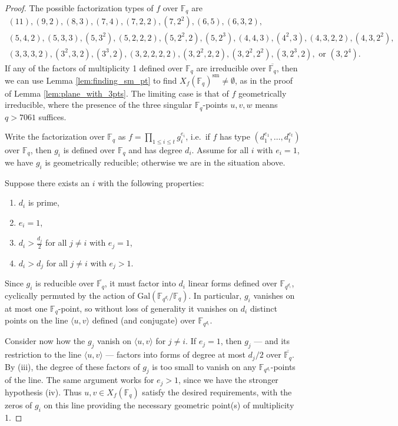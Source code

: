 \documentclass[10pt,a4paper]{amsart}
\newcommand{\F}{\mathbb{F}}
\newcommand{\Span}[1]{\langle #1 \rangle}
\newcommand{\qbound}[1]{{\color{cyan}$q > {#1}$}}
\newcommand{\sm}{\mathrm{sm}}
\begin{document}
\begin{proof}
    The possible factorization types of $f$ over $\F_q$ are
    \begin{align*}
        (11), (9,2), (8,3), 
        (7,4), (7,2,2), (7,2^2), 
        (6,5), (6,3,2), \\
        (5,4,2), (5,3,3), (5,3^2), (5,2,2,2), (5,2^2,2), (5,2^3),
        (4,4,3), (4^2,3), (4,3,2,2), (4,3,2^2),\\
        (3,3,3,2), (3^2,3,2), (3^3,2), (3,2,2,2,2), (3,2^2,2,2), (3,2^2,2^2), (3,2^3,2), \text{ or } (3,2^4).
    \end{align*}
    If any of the factors of multiplicity 1 defined over $\F_q$ are irreducible over $\overline{\F_q}$, then we can use Lemma \ref{lem:finding_sm_pt} to find $X_f(\F_q)^\sm \neq \emptyset$, as in the proof of Lemma \ref{lem:plane_with_3pts}. The limiting case is that of $f$ geometrically irreducible, where the presence of the three singular $\F_q$-points $u,v,w$ means \qbound{7061} suffices.

    Write the factorization over $\F_q$ as $f = \prod_{1 \leq i \leq t} g_i^{e_i}$, i.e.\ if $f$ has type $(d_1^{e_1},\ldots,d_t^{e_t})$ over $\F_q$, then $g_i$ is defined over $\F_q$ and has degree $d_i$. Assume for all $i$ with $e_i = 1$, we have $g_i$ is geometrically reducible; otherwise we are in the situation above.
    
    Suppose there exists an $i$ with the following properties:
    \begin{enumerate}[label = (\roman*)]
        \item $d_i$ is prime,
        \item $e_i = 1$,
        \item $d_i > \frac{d_j}{2}$ for all $j \neq i$ with $e_j = 1$,
        \item $d_i > d_j$ for all $j \neq i$ with $e_j > 1$.
    \end{enumerate}
    Since $g_i$ is reducible over $\overline{\F_q}$, it must factor into $d_i$ linear forms defined over $\F_{q^{d_i}}$, cyclically permuted by the action of $\mathrm{Gal}(\F_{q^{d_i}}/\F_q)$. In particular, $g_i$ vanishes on at most one $\F_q$-point, so without loss of generality it vanishes on $d_i$ distinct points on the line $\Span{u,v}$ defined (and conjugate) over $\F_{q^{d_i}}$.

    Consider now how the $g_j$ vanish on $\Span{u,v}$ for $j \neq i$. If $e_j = 1$, then $g_j$ --- and its restriction to the line $\Span{u,v}$ --- factors into forms of degree at most $d_j/2$ over $\overline{\F_q}$. By (iii), the degree of these factors of $g_j$ is too small to vanish on any $\F_{q^{d_i}}$-points of the line. The same argument works for $e_j > 1$, since we have the stronger hypothesis (iv). Thus $u,v \in X_f(\F_q)$ satisfy the desired requirements, with the zeros of $g_i$ on this line providing the necessary geometric point(s) of multiplicity 1. 


\end{proof}
\end{document}

